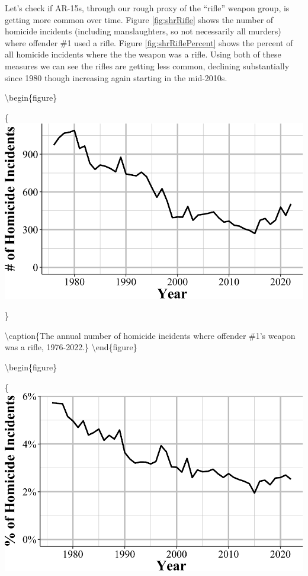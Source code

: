 \documentclass[
  12pt,
  openany]{book}
\begin{document}
Let's check if AR-15s, through our rough proxy of the ``rifle'' weapon group, is getting more common over time. Figure \ref{fig:shrRifle} shows the number of homicide incidents (including manslaughters, so not necessarily all murders) where offender \#1 used a rifle. Figure \ref{fig:shrRiflePercent} shows the percent of all homicide incidents where the the weapon was a rifle. Using both of these measures we can see the rifles are getting less common, declining substantially since 1980 though increasing again starting in the mid-2010s.

\textbackslash begin\{figure\}

\{\centering \includegraphics[width=0.9\linewidth]{06_shr_files/figure-latex/shrRifle-1}

\}

\textbackslash caption\{The annual number of homicide incidents where offender \#1's weapon was a rifle, 1976-2022.\}\label{fig:shrRifle}
\textbackslash end\{figure\}

\textbackslash begin\{figure\}

\{\centering \includegraphics[width=0.9\linewidth]{06_shr_files/figure-latex/shrRiflePercent-1}
\end{document}
